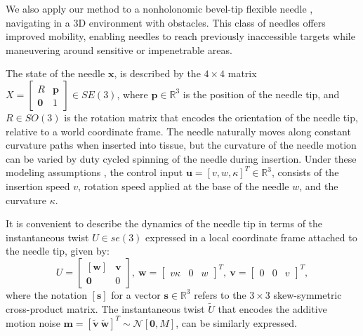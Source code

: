 \begin{figure}[!t]
\vspace*{-15pt}
\label{fig:needle3d}
\end{figure}

We also apply our method to a nonholonomic bevel-tip flexible needle \cite{Cowan2011_Chapter}, navigating in a 3D environment with obstacles. This class of needles offers improved mobility,
enabling needles to reach previously inaccessible targets while maneuvering around sensitive or impenetrable areas.

The state of the needle $\mathbf{x}$, is described by the $4 \times 4$ matrix $X = \left[\begin{smallmatrix} R & \mathbf{p} \\ \mathbf{0} & 1 \end{smallmatrix} \right] \in SE(3)$, where $\mathbf{p} \in \mathbb{R}^3$ is the position of the needle tip, and $R \in SO(3)$ is the rotation matrix that encodes the orientation of the needle tip, relative to a world coordinate frame. The needle naturally moves along constant curvature paths when inserted into tissue, but the curvature of the needle motion can be varied by duty cycled spinning of the needle during insertion. Under these modeling assumptions \cite{vandenBerg10_WAFR}, the control input $\mathbf{u} = [v, w, \kappa]^T \in \mathbb{R}^3$, consists of the insertion speed $v$, rotation speed applied at the base of the needle $w$, and the curvature $\kappa$.

It is convenient to describe the dynamics of the needle tip in terms of the instantaneous twist $U \in se(3)$ expressed in a local coordinate frame attached to the needle tip, given by:
\begin{equation}
U = \begin{bmatrix} [\mathbf{w}] & \mathbf{v} \\ \mathbf{0} & 0 \end{bmatrix}, ~ \mathbf{w} = \begin{bmatrix} v\kappa & 0 & w \end{bmatrix}^T, ~ \mathbf{v} = \begin{bmatrix} 0 & 0 & v \end{bmatrix}^T,
\end{equation}
where the notation $[\mathbf{s}]$ for a vector $\mathbf{s} \in \mathbb{R}^3$ refers to the $3 \times 3$ skew-symmetric cross-product matrix. The instantaneous twist $\tilde{U}$ that encodes the additive motion noise $\mathbf{m} = [\tilde{\mathbf{v}} ~ \tilde{\mathbf{w}}]^T \sim  \mathcal{N}[\mathbf{0}, M]$, can be similarly expressed.

